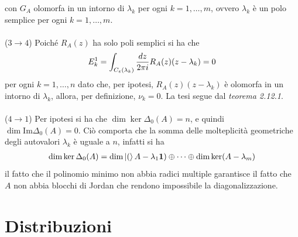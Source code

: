 \documentclass{article}
\begin{document}
con $G_A$ olomorfa in un intorno di $\lambda_k$ per ogni $k = 1, \dots, m$, ovvero $\lambda_k$ è un polo semplice per ogni $k = 1, \dots, m$. \\ \\
($3 \rightarrow 4$) Poiché $R_A(z)$ ha solo poli semplici si ha che
\begin{gather}
    E_k^1 = \int_{C_\varepsilon(\lambda_k)}\frac{dz}{2\pi i}R_A(z)(z - \lambda_k) = 0 \notag
\end{gather}
per ogni $k = 1, \dots, n$ dato che, per ipotesi, $R_A(z)(z - \lambda_k)$ è olomorfa in un intorno di $\lambda_k$, allora, per definizione, $\nu_k = 0$. La tesi segue dal \textit{teorema 2.12.1}. \\ \\
($4 \rightarrow 1$) Per ipotesi si ha che $\dim\ker \Delta_0(A) = n$, e quindi $\dim\mathrm{Im}\Delta_0(A) = 0$. Ciò comporta che la somma delle molteplicità geometriche degli autovalori $\lambda_k$ è uguale a $n$, infatti si ha
\begin{gather}
    \dim\ker\Delta_0(A) = \dim\ket(A - \lambda_1\mathbf{1}) \oplus \dots \oplus \dim\ker(A - \lambda_m) \notag
\end{gather}
il fatto che il polinomio minimo non abbia radici multiple garantisce il fatto che $A$ non abbia blocchi di Jordan che rendono impossibile la diagonalizzazione.





\newpage
\section{Distribuzioni}
\end{document}
